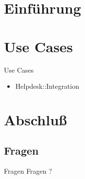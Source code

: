 
\maketitle

\begin{frame}
  \titlepage
\end{frame}

\cleardoublepage

\tableofcontents

\cleardoublepage

\section{Einführung}

\section{Use Cases}

\begin{frame}{Use Cases}
\begin{itemize}
  \item Helpdesk::Integration
\end{itemize}
\end{frame}

\section{Abschluß}

\subsection{Fragen}

\begin{frame}{Fragen}
\centering
Fragen ?
\end{frame}



